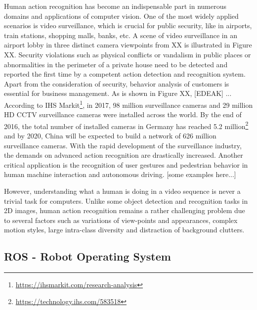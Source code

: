 Human action recognition has become an indispensable part in numerous domains and applications of computer vision. One of the most widely applied scenarios is video surveillance, which is crucial for public security, like in airports, train stations, shopping malls, banks, etc. A scene of video surveillance in an airport lobby in three distinct camera viewpoints from XX is illustrated in Figure XX. Security violations such as physical conflicts or vandalism in public places or abnormalities
in the perimeter of a private house need to be detected and reported the first time by a competent action detection and recognition system. Apart from the consideration of security, behavior analysis of customers is essential for business management. As is shown in Figure XX, [EDEAK] ...  According to IHS Markit\footnote{\url{https://ihsmarkit.com/research-analysis}}, in 2017, 98 million surveillance cameras and 29 million HD CCTV surveillance cameras were installed across the world. By the end of 2016, the total number of installed cameras in Germany has reached 5.2 million\footnote{\url{https://technology.ihs.com/583518}} and by 2020, China will be expected to build a network of 626 million surveillance cameras. With the rapid development of the surveillance industry, the demands on advanced action recognition are drastically increased. Another critical application is the recognition of user gestures and pedestrian behavior in human machine interaction and autonomous driving. [some examples here...]

However, understanding what a human is doing in a video sequence is never a trivial task for computers. Unlike some object detection and recognition tasks in 2D images, human action recognition remains a rather challenging problem due to several factors such as variations of view-points and appearances, complex motion styles, large intra-class diversity and distraction of background clutters.
\medskip

\subsection{ROS - Robot Operating System}


